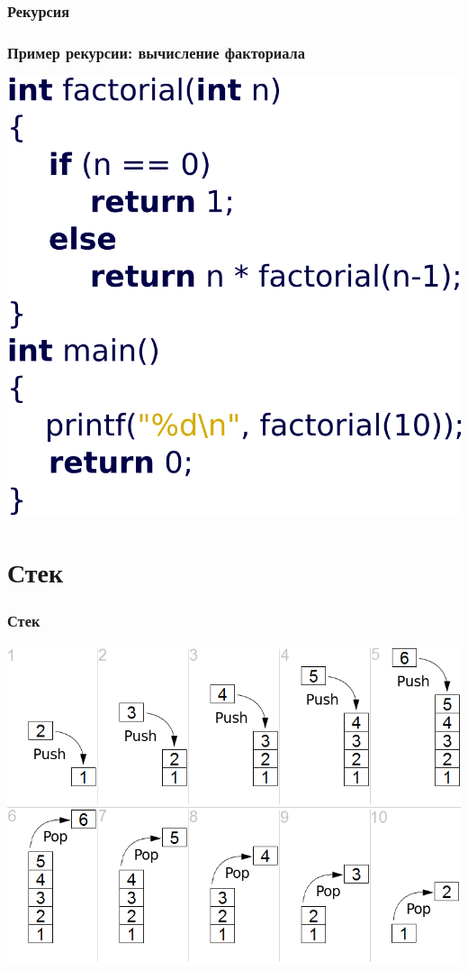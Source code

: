 \documentclass[12pt,pdf,hyperref={unicode}]{beamer}
\begin{document}
\begin{frame}[fragile]
\frametitle{Рекурсия} 
\frametitle{Пример рекурсии: вычисление факториала} 
\begin{center}
\includegraphics[width=0.65\linewidth]{images/function_recursive.png}
\end{center}
\end{frame}



\section{Стек}

\begin{frame}[fragile]
\frametitle{Стек} 
\begin{center}
\includegraphics[width=\linewidth]{images/Lifo_stack.png}
\end{center}
\end{frame}
\end{document}
